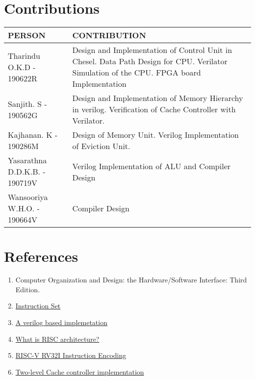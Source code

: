 \documentclass[12pt]{article}
\begin{document}
    \section{Contributions}
    \begin{tabular}{|m{15em}|m{25em}|}
        \toprule
        PERSON & CONTRIBUTION\\
        \toprule\midrule
        Tharindu O.K.D - 190622R & Design and Implementation of Control Unit in Chesel. Data Path Design for CPU. Verilator Simulation of the CPU. FPGA board Implementation\\\midrule
        Sanjith. S - 190562G & Design and Implementation of Memory Hierarchy in verilog. Verification of Cache Controller with Verilator.\\\midrule
        Kajhanan. K - 190286M & Design of Memory Unit. Verilog Implementation of Eviction Unit.\\\midrule
        Yasarathna D.D.K.B. - 190719V & Verilog Implementation of ALU and Compiler Design\\\midrule
        Wansooriya W.H.O. - 190664V & Compiler Design\\\midrule
    \end{tabular}
    \vfill
    \section*{References}
    \begin{enumerate}
        \item Computer Organization and Design: the Hardware/Software Interface: Third Edition.
        \item \href{https://five-embeddev.com/riscv-isa-manual/latest/rv32.html}{Instruction Set}
        \item \href{https://github.com/paulsonkantony/risk-five}{A verilog based implemetation}
        \item \href{https://www.educative.io/answers/what-is-risc-architecture}{What is RISC architecture?}
        \item \href{https://www.youtube.com/watch?v=VNy-J0u7-jY}{RISC-V RV32I Instruction Encoding}
        \item \href{https://github.com/omega-rg/Cache-Controller}{Two-level Cache controller implementation}
    \end{enumerate}
\end{document}
